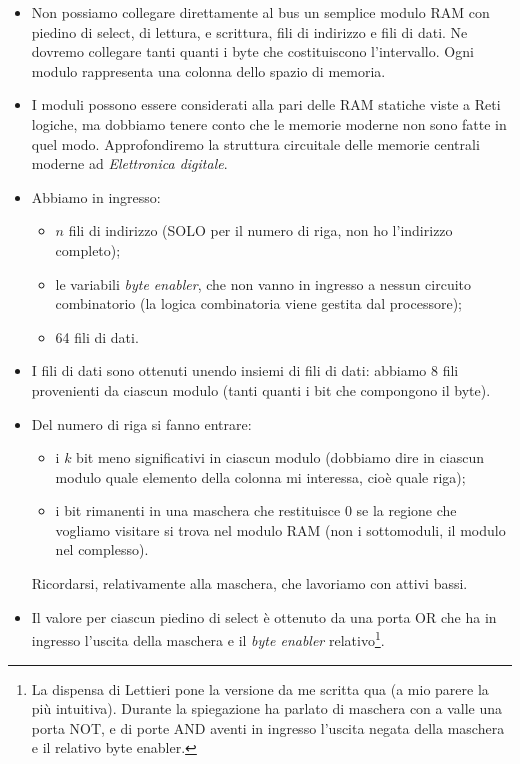 \documentclass[11pt]{report}
\theoremstyle{definition}
\begin{document}
\begin{itemize}
\item Non possiamo collegare direttamente al bus un semplice modulo RAM con piedino di select, di lettura, e scrittura, fili di indirizzo e fili di dati. Ne dovremo collegare tanti quanti i byte che costituiscono l'intervallo. Ogni modulo rappresenta una colonna dello spazio di memoria.
\item I moduli possono essere considerati alla pari delle RAM statiche viste a Reti logiche, ma dobbiamo tenere conto che le memorie moderne non sono fatte in quel modo. Approfondiremo la struttura circuitale delle memorie centrali moderne ad \emph{Elettronica digitale}.
\item Abbiamo in ingresso:
\small
\begin{itemize}
\item $n$ fili di indirizzo (SOLO per il numero di riga, non ho l'indirizzo completo);
\item le variabili \emph{byte enabler}, che non vanno in ingresso a nessun circuito combinatorio (la logica combinatoria viene gestita dal processore);
\item 64 fili di dati.
\end{itemize}
\normalsize
\item I fili di dati sono ottenuti unendo insiemi di fili di dati: abbiamo $8$ fili provenienti da ciascun modulo (tanti quanti i bit che compongono il byte).
\item Del numero di riga si fanno entrare:
\small
\begin{itemize}
\item i $k$ bit meno significativi in ciascun modulo (dobbiamo dire in ciascun modulo quale elemento della colonna mi interessa, cioè quale riga);
\item i bit rimanenti in una maschera che restituisce $0$ se la regione che vogliamo visitare si trova nel modulo RAM (non i sottomoduli, il modulo nel complesso).
\end{itemize}
\normalsize
Ricordarsi, relativamente alla maschera, che lavoriamo con attivi bassi.
\item Il valore per ciascun piedino di select è ottenuto da una porta OR che ha in ingresso l'uscita della maschera e il \emph{byte enabler} relativo\footnote{La dispensa di Lettieri pone la versione da me scritta qua (a mio parere la più intuitiva). Durante la spiegazione ha parlato di maschera con a valle una porta NOT, e di porte AND aventi in ingresso l'uscita negata della maschera e il relativo byte enabler.}.
\end{itemize}
\end{document}
